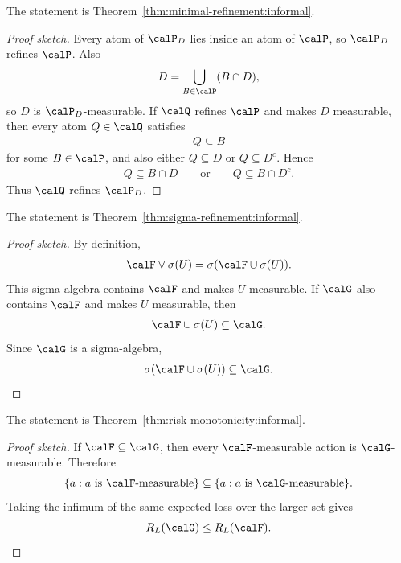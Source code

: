 \begin{theorem}
\label{thm:minimal-refinement:sketch}
The statement is Theorem~\ref{thm:minimal-refinement:informal}.
\end{theorem}
\begin{proof}[Proof sketch]
Every atom of $\calP_D$ lies inside an atom of $\calP$, so $\calP_D$ refines $\calP$. Also
\begin{align*}
D=\bigcup_{B\in\calP}(B\cap D),
\end{align*}
so $D$ is $\calP_D$-measurable. If $\calQ$ refines $\calP$ and makes $D$ measurable, then every atom $Q\in\calQ$ satisfies
\begin{align*}
Q\subseteq B
\end{align*}
for some $B\in\calP$, and also either $Q\subseteq D$ or $Q\subseteq D^c$. Hence
\begin{align*}
Q\subseteq B\cap D\qquad \text{or}\qquad Q\subseteq B\cap D^c.
\end{align*}
Thus $\calQ$ refines $\calP_D$.
\end{proof}
\begin{theorem}
\label{thm:sigma-refinement:sketch}
The statement is Theorem~\ref{thm:sigma-refinement:informal}.
\end{theorem}
\begin{proof}[Proof sketch]
By definition,
\begin{align*}
\calF\vee\sigma(U)=\sigma(\calF\cup\sigma(U)).
\end{align*}
This sigma-algebra contains $\calF$ and makes $U$ measurable. If $\calG$ also contains $\calF$ and makes $U$ measurable, then
\begin{align*}
\calF\cup\sigma(U)\subseteq\calG.
\end{align*}
Since $\calG$ is a sigma-algebra,
\begin{align*}
\sigma(\calF\cup\sigma(U))\subseteq\calG.
\end{align*}
\end{proof}

\begin{theorem}
\label{thm:risk-monotonicity:sketch}
The statement is Theorem~\ref{thm:risk-monotonicity:informal}.
\end{theorem}
\begin{proof}[Proof sketch]
If $\calF\subseteq\calG$, then every $\calF$-measurable action is $\calG$-measurable. Therefore
\begin{align*}
\{a:a\text{ is }\calF\text{-measurable}\}\subseteq\{a:a\text{ is }\calG\text{-measurable}\}.
\end{align*}
Taking the infimum of the same expected loss over the larger set gives
\begin{align*}
R_L(\calG)\le R_L(\calF).
\end{align*}
\end{proof}

